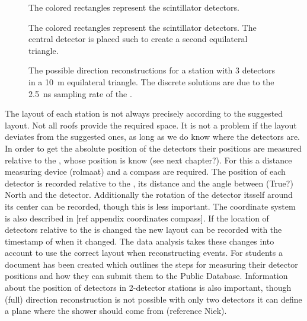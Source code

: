 \begin{figure}
    \centering
    
    \caption{ The colored
             rectangles represent the scintillator detectors.}
    \label{fig:4_detector_star}
\end{figure}

\begin{figure}
    \centering
    
    \caption{ The colored              rectangles represent the scintillator detectors. The central detector is placed such to create a second equilateral triangle.}
    \label{fig:4_detector_diamond}
\end{figure}

\begin{figure}
    \centering
    
    \caption{ The possible
             direction reconstructions for a station with 3 detectors in
             a \SI{10}{\meter} equilateral triangle. The discrete
             solutions are due to the \SI{2.5}{\ns} sampling
             rate of the \adcs.}
    \label{fig:discrete_directions}
\end{figure}

The layout of each station is not always precisely according to the suggested layout. Not all roofs provide the required space. It is not a problem if the layout deviates from the suggested ones, as long as we do know where the detectors are. In order to get the absolute position of the detectors their positions are measured relative to the \gps, whose position is know (see next chapter?). For this a distance measuring device (rolmaat) and a compass are required. The position of each detector is recorded relative to the \gps, its distance and the angle between (True?) North and the detector. Additionally the rotation of the detector itsself around its center can be recorded, though this is less important. The coordinate system is also described in [ref appendix coordinates compass]. If the location of detectors relative to the \gps is changed the new layout can be recorded with the timestamp of when it changed. The data analysis takes these changes into account to use the correct layout when reconstructing events. For students a document has been created which outlines the steps for measuring their detector positions and how they can submit them to the Public Database. Information about the position of detectors in 2-detector stations is also important, though (full) direction reconstruction is not possible with only two detectors it can define a plane where the shower should come from (reference Niek).


